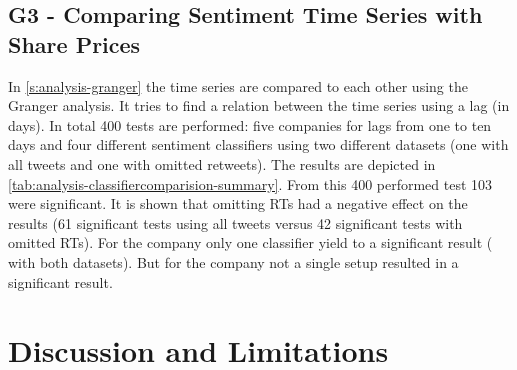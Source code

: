 \subsection{G3 - Comparing Sentiment Time Series with Share Prices}
\label{ss:conclusion-summary-g3}



In \cref{s:analysis-granger} the time series are compared to each other using the Granger analysis.
It tries to find a relation between the time series using a lag (in days).
In total 400 tests are performed: five companies for lags from one to ten days and four different sentiment classifiers using two different datasets (one with all tweets and one with omitted retweets).
The results are depicted in \cref{tab:analysis-classifiercomparision-summary}.
From this 400 performed test 103 were significant.
It is shown that omitting \acp{RT} had a negative effect on the results (61 significant tests using all tweets versus 42 significant tests with omitted \acp{RT}).
For the company \ford{} only one classifier yield to a significant result (\fnb{} with both datasets).
But for the company \toyota{} not a single setup resulted in a significant result.

\section{Discussion and Limitations}
\label{s:conclusions-discussion}

